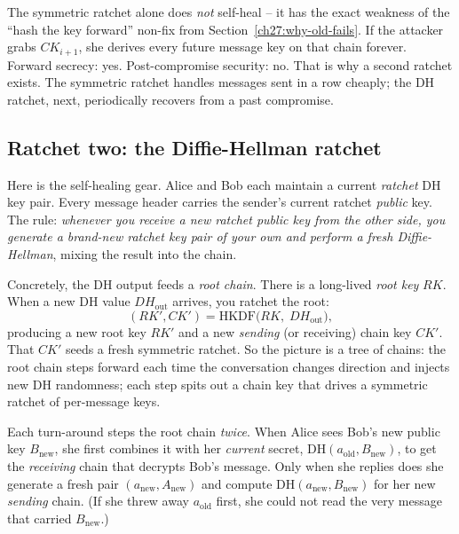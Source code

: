 \begin{trapbox}
The symmetric ratchet alone does \emph{not} self-heal -- it has the exact weakness of the ``hash the key forward'' non-fix from Section~\ref{ch27:why-old-fails}. If the attacker grabs $CK_{i+1}$, she derives every future message key on that chain forever. Forward secrecy: yes. Post-compromise security: no. That is why a second ratchet exists. The symmetric ratchet handles messages sent in a row cheaply; the DH ratchet, next, periodically recovers from a past compromise.
\end{trapbox}

\subsection{Ratchet two: the Diffie-Hellman ratchet}
\label{ch27:dh-ratchet}

Here is the self-healing gear. Alice and Bob each maintain a current \emph{ratchet} DH key pair. Every message header carries the sender's current ratchet \emph{public} key. The rule: \emph{whenever you receive a new ratchet public key from the other side, you generate a brand-new ratchet key pair of your own and perform a fresh Diffie-Hellman}, mixing the result into the chain.

Concretely, the DH output feeds a \emph{root chain}. There is a long-lived \emph{root key} $RK$. When a new DH value $DH_{\mathrm{out}}$ arrives, you ratchet the root:
\[
(RK', CK') = \mathrm{HKDF}\big(RK,\; DH_{\mathrm{out}}\big),
\]
producing a new root key $RK'$ and a new \emph{sending} (or receiving) chain key $CK'$. That $CK'$ seeds a fresh symmetric ratchet. So the picture is a tree of chains: the root chain steps forward each time the conversation changes direction and injects new DH randomness; each step spits out a chain key that drives a symmetric ratchet of per-message keys.

Each turn-around steps the root chain \emph{twice}. When Alice sees Bob's new public key $B_{\text{new}}$, she first combines it with her \emph{current} secret, $\mathrm{DH}(a_{\text{old}}, B_{\text{new}})$, to get the \emph{receiving} chain that decrypts Bob's message. Only when she replies does she generate a fresh pair $(a_{\text{new}}, A_{\text{new}})$ and compute $\mathrm{DH}(a_{\text{new}}, B_{\text{new}})$ for her new \emph{sending} chain. (If she threw away $a_{\text{old}}$ first, she could not read the very message that carried $B_{\text{new}}$.)

